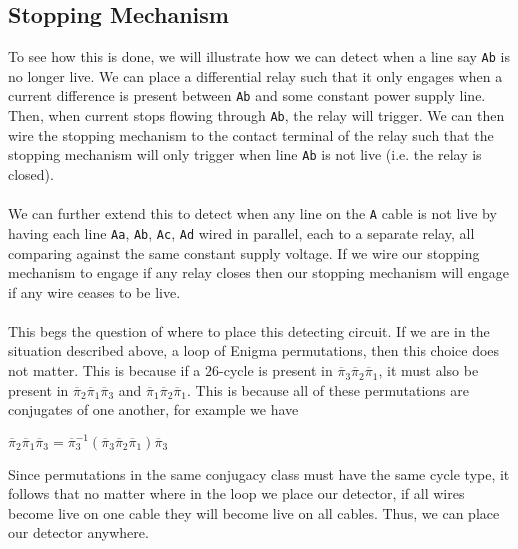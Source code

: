 \subsection{Stopping Mechanism}
To see how this is done, we will illustrate how we can detect
when a line say \texttt{Ab} is no longer live. We can place a differential
relay such that it only engages when a current difference is present
between \texttt{Ab} and some constant power supply line. Then, when current stops
flowing through \texttt{Ab}, the relay will trigger. We can then wire the
stopping mechanism to the contact terminal of the relay such that the
stopping mechanism will only trigger when line \texttt{Ab} is not live (i.e.
the relay is closed).
\\\\We can further extend this to detect when any line on the \texttt{A}
cable is not live by having each line \texttt{Aa}, \texttt{Ab}, \texttt{Ac}, \texttt{Ad} wired in
parallel, each to a separate relay, all comparing against the same
constant supply voltage. If we wire our stopping mechanism to engage
if any relay closes
then our stopping mechanism will engage if any wire ceases to be live.
\\\\This begs the question of where to place this detecting circuit.
If we are in the situation described above, a loop of Enigma
permutations, then this choice does not matter. This is because if a
$26$-cycle is present in
$\overline\pi_3\overline\pi_2\overline\pi_1$, it must also
be present in
$\overline\pi_2\overline\pi_1\overline\pi_3$ and
$\overline\pi_1\overline\pi_2\overline\pi_1$. This is
because all of these permutations are conjugates of one another, for
example we have
\begin{center}
	$\overline\pi_2\overline\pi_1\overline\pi_3 =
		\overline\pi_3^{-1}(\overline\pi_3\overline\pi_2\overline\pi_1)\overline\pi_3$
\end{center}
Since permutations in the same conjugacy class must have the same
cycle type, it follows that no matter where in the loop we place our
detector, if all wires become live on one cable they will become live on all cables. Thus, we can place our detector anywhere.


